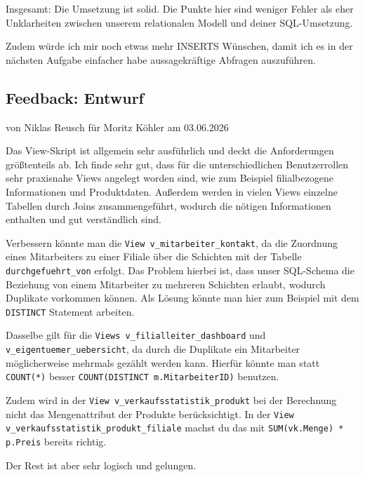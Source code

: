 \documentclass[a4paper]{article}
\begin{document}
Insgesamt: Die Umsetzung ist solid. Die Punkte hier sind weniger Fehler als eher Unklarheiten zwischen unserem relationalen Modell und deiner SQL-Umsetzung.

Zudem würde ich mir noch etwas mehr INSERTS Wünschen, damit ich es in der nächsten Aufgabe einfacher habe aussagekräftige Abfragen auszuführen.

\newpage
\subsection{Feedback: Entwurf}

\begin{flushright}
von Niklas Reusch für Moritz Köhler am 03.06.2026
\end{flushright}

Das View-Skript ist allgemein sehr ausführlich und deckt die Anforderungen größtenteils ab. Ich finde sehr gut, dass für die unterschiedlichen Benutzerrollen sehr praxisnahe Views angelegt worden sind, wie zum Beispiel filialbezogene Informationen und Produktdaten. Außerdem werden in vielen Views einzelne Tabellen durch Joins zusammengeführt, wodurch die nötigen Informationen enthalten und gut verständlich sind.

Verbessern könnte man die \lstinline|View v_mitarbeiter_kontakt|, da die Zuordnung eines Mitarbeiters zu einer Filiale über die Schichten mit der Tabelle \lstinline|durchgefuehrt_von| erfolgt. Das Problem hierbei ist, dass unser SQL-Schema die Beziehung von einem Mitarbeiter zu mehreren Schichten erlaubt, wodurch Duplikate vorkommen können. Als Lösung könnte man hier zum Beispiel mit dem \lstinline|DISTINCT| Statement arbeiten. 

\begin{sloppypar}
Dasselbe gilt für die \lstinline|Views v_filialleiter_dashboard| und \lstinline|v_eigentuemer_uebersicht|, da durch die Duplikate ein Mitarbeiter möglicherweise mehrmals gezählt werden kann.
Hierfür könnte man statt \lstinline|COUNT(*)| besser \lstinline|COUNT(DISTINCT m.MitarbeiterID)| benutzen.
\end{sloppypar}

\begin{sloppypar}
Zudem wird in der \lstinline|View v_verkaufsstatistik_produkt| bei der Berechnung nicht das Mengenattribut der Produkte berücksichtigt. In der \lstinline|View v_verkaufsstatistik_produkt_filiale| machst du das mit \lstinline|SUM(vk.Menge) * p.Preis| bereits richtig.
\end{sloppypar}

Der Rest ist aber sehr logisch und gelungen.
\end{document}
